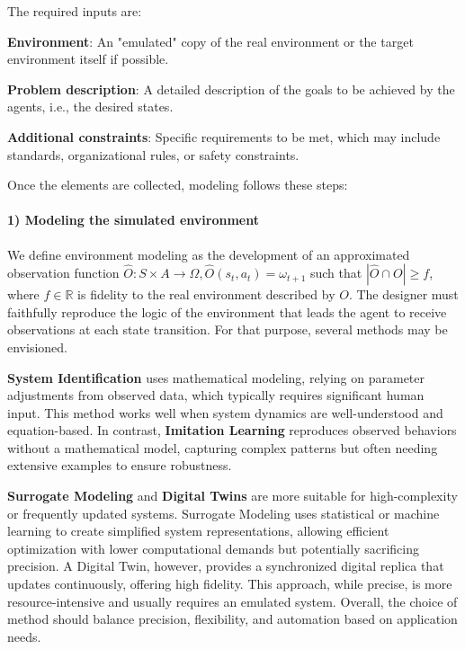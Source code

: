 \documentclass[sigconf,anonymous]{aamas}
\begin{document}
The required inputs are:
\begin{enumerate*}[label={\roman*)}]
    \item \textbf{Environment}: An "emulated" copy of the real environment or the target environment itself if possible.
    \item \textbf{Problem description}: A detailed description of the goals to be achieved by the agents, i.e., the desired states.
    \item \textbf{Additional constraints}: Specific requirements to be met, which may include standards, organizational rules, or safety constraints.
\end{enumerate*}

Once the elements are collected, modeling follows these steps: 


\paragraph{\textbf{1) Modeling the simulated environment}} \quad

\noindent We define environment modeling as the development of an approximated observation function $\hat{O}: S \times A \to \Omega, \hat{O}(s_t,a_t) = \omega_{t+1}$ such that $|\hat{O} \cap O| \geq f$, where $f \in \mathbb{R}$ is fidelity to the real environment described by $O$.
The designer must faithfully reproduce the logic of the environment that leads the agent to receive observations at each state transition. 
For that purpose, several methods may be envisioned.

\textbf{System Identification} uses mathematical modeling, relying on parameter adjustments from observed data, which typically requires significant human input. This method works well when system dynamics are well-understood and equation-based. In contrast, \textbf{Imitation Learning} reproduces observed behaviors without a mathematical model, capturing complex patterns but often needing extensive examples to ensure robustness.

\textbf{Surrogate Modeling} and \textbf{Digital Twins} are more suitable for high-complexity or frequently updated systems. Surrogate Modeling uses statistical or machine learning to create simplified system representations, allowing efficient optimization with lower computational demands but potentially sacrificing precision. A Digital Twin, however, provides a synchronized digital replica that updates continuously, offering high fidelity. This approach, while precise, is more resource-intensive and usually requires an emulated system. Overall, the choice of method should balance precision, flexibility, and automation based on application needs.
\end{document}
